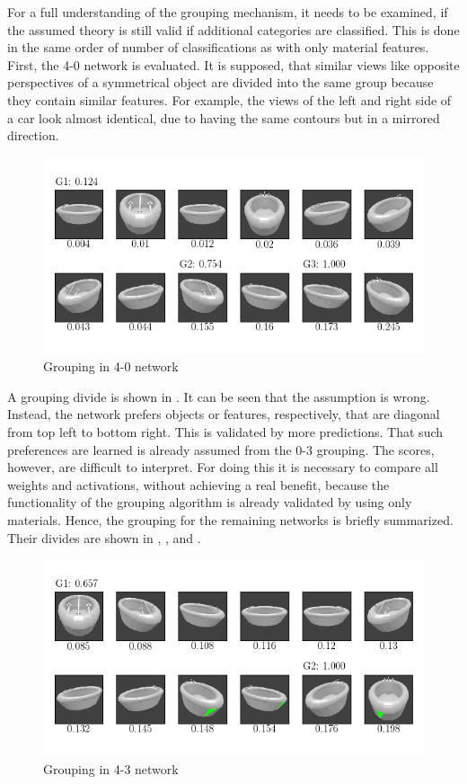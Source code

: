For a full understanding of the grouping mechanism, it needs to be examined, if the assumed theory is still valid if additional categories are classified.
This is done in the same order of number of classifications as with only material features.
First, the 4-0 network is evaluated.
It is supposed, that similar views like opposite perspectives of a symmetrical object are divided into the same group because they contain similar features.
For example, the views of the left and right side of a car look almost identical, due to having the same contours but in a mirrored direction.
\begin{figure}
	\centering
	\includegraphics[trim=10 20 10 20, clip]{images/mn-sl-4-0-20/bathtub_0107_0_grouping.png}
	\caption{Grouping in 4-0 network}
	\label{fig:grouping-4-0}
\end{figure}
A grouping divide is shown in .
It can be seen that the assumption is wrong.
Instead, the network prefers objects or features, respectively, that are diagonal from top left to bottom right.
This is validated by more predictions.
That such preferences are learned is already assumed from the 0-3 grouping.
The scores, however, are difficult to interpret.
For doing this it is necessary to compare all weights and activations, without achieving a real benefit, because the functionality of the grouping algorithm is already validated by using only materials.
Hence, the grouping for the remaining networks is briefly summarized.
Their divides are shown in , ,  and .
\begin{figure}
	\centering
	\includegraphics[trim=10 20 10 20, clip]{images/mn-sl-4-3-20/bathtub_0107_1_grouping.png}
	\caption{Grouping in 4-3 network}
	\label{fig:grouping-4-3}
\end{figure}
